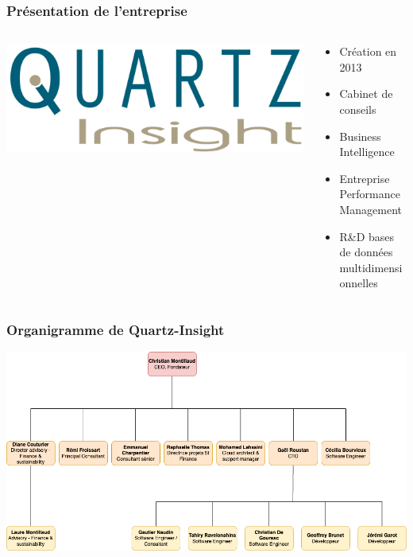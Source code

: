 \documentclass[aspectratio=169]{beamer}
\begin{document}
\begin{frame}
    \frametitle{Présentation de l'entreprise}
    \begin{columns}
        \begin{column}{0.5\textwidth}
            \includegraphics[height=0.20\textheight]{Imgs/logo-quartz-insight-v2.png}
        \end{column}
        \begin{column}{0.5\textwidth}
            \begin{itemize}
                \item Création en 2013
                \item Cabinet de conseils
                \item Business Intelligence
                \item Entreprise Performance Management
                \item R\&D bases de données multidimensionnelles
            \end{itemize}
        \end{column}
    \end{columns}
\end{frame}

\begin{frame}
    \frametitle{Organigramme de Quartz-Insight}
    \includegraphics[height=0.65\textheight, center]{Imgs/organigramme-quartz-insight.png}
\end{frame}
\end{document}
